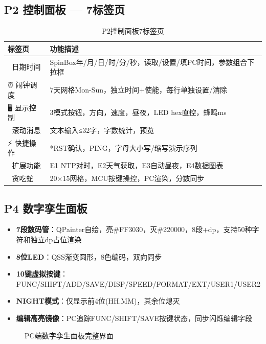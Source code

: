 \documentclass[12pt,hyperref,a4paper,UTF8]{ctexart}
\begin{document}
\subsection{P2 控制面板 — 7标签页}

\begin{table}[!htbp]
    \centering
    \begin{tabular}{l|l}
    \hline
    \textbf{标签页} & \textbf{功能描述} \\
    \hline
    📅 日期时间 & SpinBox年/月/日/时/分/秒，读取/设置/填PC时间，参数组合下拉框 \\
    ⏰ 闹钟调度 & 7天网格Mon-Sun，独立时间+使能，每行单独设置/清除 \\
    🖥️ 显示控制 & 3模式按钮，方向，速度，昼夜，LED hex直控，蜂鸣ms \\
    📝 滚动消息 & 文本输入≤32字，字数统计，预览 \\
    ⚡ 快捷操作 & *RST确认，PING，字母大小写/缩写演示序列 \\
    🔌 扩展功能 & E1 NTP对时，E2天气获取，E3自动昼夜，E4数据图表 \\
    🐍 贪吃蛇 & 20×15网格，MCU按键操控，PC渲染，分数同步 \\
    \hline
    \end{tabular}
    \caption{P2控制面板7标签页}
\end{table}

\subsection{P4 数字孪生面板}

\begin{itemize}
    \item \textbf{7段数码管}：QPainter自绘，亮\#FF3030，灭\#220000，8段+dp，支持50种字符和独立dp占位渲染
    \item \textbf{8位LED}：QSS渐变圆形，8色编码，双向同步
    \item \textbf{10键虚拟按键}：FUNC/SHIFT/ADD/SAVE/DISP/SPEED/FORMAT/EXT/USER1/USER2
    \item \textbf{NIGHT模式}：仅显示前4位(HH.MM)，其余位熄灭
    \item \textbf{编辑高亮镜像}：PC追踪FUNC/SHIFT/SAVE按键状态，同步闪烁编辑字段
\end{itemize}

\begin{figure}[!htbp]
    \centering
    \caption{PC端数字孪生面板完整界面}
    \label{fig:pcfull}
\end{figure}
\end{document}
